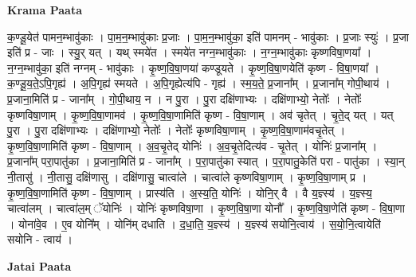 \documentclass[17pt]{extarticle}
\begin{document}
\textbf{Krama Paata} \newline

क॒ण्डू॒येत॑ पामन॒म्भावु॑काः । पा॒म॒न॒म्भावु॑काः प्र॒जाः । पा॒म॒न॒म्भावु॑का॒ इति॑ पामनम् - भावु॑काः । प्र॒जाः स्युः॑ । प्र॒जा इति॑ प्र - जाः । स्यु॒र् यत् । यथ् स्मये॑त । स्मये॑त नग्न॒म्भावु॑काः । न॒ग्न॒म्भावु॑काः कृष्णविषा॒णया᳚ । न॒ग्न॒म्भावु॑का॒ इति॑ नग्नम् - भावु॑काः । कृ॒ष्ण॒वि॒षा॒णया॑ कण्डूयते । कृ॒ष्ण॒वि॒षा॒णयेति॑ कृष्ण - वि॒षा॒णया᳚ । क॒ण्डू॒य॒ते॒ऽपि॒गृह्य॑ । अ॒पि॒गृह्य॑ स्मयते । अ॒पि॒गृह्येत्य॑पि - गृह्य॑ । स्म॒य॒ते॒ प्र॒जाना᳚म् । प्र॒जाना᳚म् गोपी॒थाय॑ । प्र॒जाना॒मिति॑ प्र - जाना᳚म् । गो॒पी॒थाय॒ न । न पु॒रा । पु॒रा दक्षि॑णाभ्यः । दक्षि॑णाभ्यो॒ नेतोः᳚ । नेतोः᳚ कृष्णविषा॒णाम् । कृ॒ष्ण॒वि॒षा॒णामव॑ । कृ॒ष्ण॒वि॒षा॒णामिति॑ कृष्ण - वि॒षा॒णाम् । अव॑ चृतेत् । चृ॒ते॒द् यत् । यत् पु॒रा । पु॒रा दक्षि॑णाभ्यः । दक्षि॑णाभ्यो॒ नेतोः᳚ । नेतोः᳚ कृष्णविषा॒णाम् । कृ॒ष्ण॒वि॒षा॒णाम॑वचृ॒तेत् । कृ॒ष्ण॒वि॒षा॒णामिति॑ कृष्ण - वि॒षा॒णाम् । अ॒व॒चृ॒तेद् योनिः॑ । अ॒व॒चृ॒तेदित्य॑व - चृ॒तेत् । योनिः॑ प्र॒जाना᳚म् । प्र॒जाना᳚म् परा॒पातु॑का । प्र॒जाना॒मिति॑ प्र - जाना᳚म् । प॒रा॒पातु॑का स्यात् । प॒रा॒पातु॒केति॑ परा - पातु॑का । स्या॒न् नी॒तासु॑ । नी॒तासु॒ दक्षि॑णासु । दक्षि॑णासु॒ चात्वा॑ले । चात्वा॑ले कृष्णविषा॒णाम् । कृ॒ष्ण॒वि॒षा॒णाम् प्र । कृ॒ष्ण॒वि॒षा॒णामिति॑ कृष्ण - वि॒षा॒णाम् । प्रास्य॑ति । अ॒स्य॒ति॒ योनिः॑ । योनि॒र् वै । वै य॒ज्ञ्स्य॑ । य॒ज्ञ्स्य॒ चात्वा॑लम् । चात्वा॑ल॒म् ॅयोनिः॑ । योनिः॑ कृष्णविषा॒णा । कृ॒ष्ण॒वि॒षा॒णा योनौ᳚ । कृ॒ष्ण॒वि॒षा॒णेति॑ कृष्ण - वि॒षा॒णा । योना॑वे॒व । ए॒व योनि᳚म् । योनि॑म् दधाति । द॒धा॒ति॒ य॒ज्ञ्स्य॑ । य॒ज्ञ्स्य॑ सयोनि॒त्वाय॑ । स॒यो॒नि॒त्वायेति॑ सयोनि - त्वाय॑ । \newline

\textbf{Jatai Paata} \newline
\end{document}
